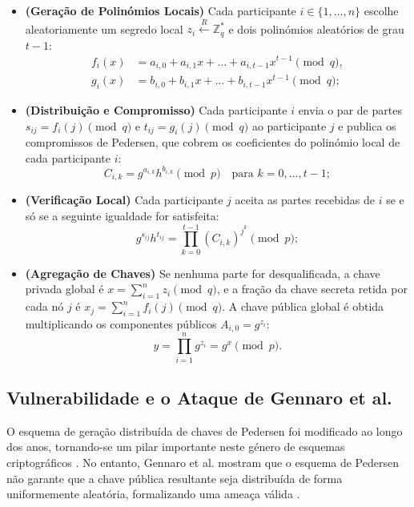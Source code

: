 \begin{itemize}
    \item \textbf{(Geração de Polinómios Locais)} Cada participante $i \in \{1, \ldots, n\}$ escolhe aleatoriamente um segredo local $z_i \xleftarrow{R} \mathbb{Z}_q^*$ e dois polinómios aleatórios de grau $t-1$:
    \begin{align*}
        f_i(x) &= a_{i,0} + a_{i,1}x + \ldots + a_{i,t-1}x^{t-1} \pmod{q}, \\
        g_i(x) &= b_{i,0} + b_{i,1}x + \ldots + b_{i,t-1}x^{t-1} \pmod{q};
    \end{align*}
    \item \textbf{(Distribuição e Compromisso)} Cada participante $i$ envia o par de partes $s_{ij} = f_i(j) \pmod{q}$ e $t_{ij} = g_i(j) \pmod{q}$ ao participante $j$ e publica os compromissos de Pedersen, que cobrem os coeficientes do polinómio local de cada participante $i$:
    \begin{equation*}
        C_{i,k} = g^{a_{i,k}} h^{b_{i,k}} \pmod{p} \quad \text{para } k = 0, \ldots, t-1;
    \end{equation*}
    \item \textbf{(Verificação Local)} Cada participante $j$ aceita as partes recebidas de $i$ se e só se a seguinte igualdade for satisfeita:
    \begin{equation*}
        g^{s_{ij}} h^{t_{ij}} = \prod_{k=0}^{t-1} (C_{i,k})^{j^k} \pmod{p};
    \end{equation*}
    \item \textbf{(Agregação de Chaves)} Se nenhuma parte for desqualificada, a chave privada global é $x = \sum_{i=1}^{n} z_i \pmod{q}$, e a fração da chave secreta retida por cada nó $j$ é $x_j = \sum_{i=1}^{n} f_i(j) \pmod{q}$. A chave pública global é obtida multiplicando os componentes públicos $A_{i,0} = g^{z_i}$:
    \begin{equation*}
        y = \prod_{i=1}^{n} g^{z_i} = g^x \pmod{p}.
    \end{equation*}
\end{itemize}

\subsection{Vulnerabilidade e o Ataque de Gennaro et al.}

O esquema de geração distribuída de chaves de Pedersen foi modificado ao longo dos anos, tornando-se um pilar importante neste género de esquemas criptográficos \cite{gennaro2007secure}. No entanto, Gennaro et al. mostram que o esquema de Pedersen não garante que a chave pública resultante seja distribuída de forma uniformemente aleatória, formalizando uma ameaça válida \cite{gennaro2007secure}.

